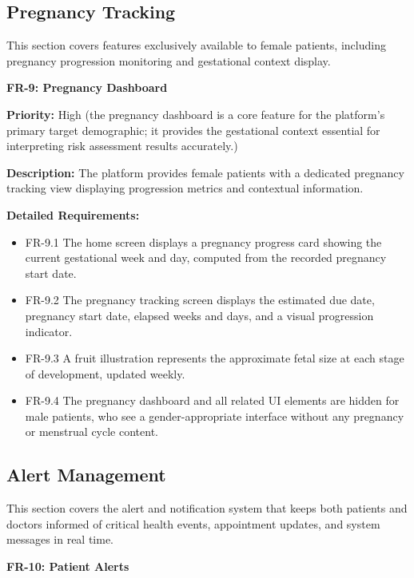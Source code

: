 \subsection{Pregnancy Tracking}

This section covers features exclusively available to female patients, including
pregnancy progression monitoring and gestational context display.

\textbf{FR-9: Pregnancy Dashboard}

\textbf{Priority:} High (the pregnancy dashboard is a core feature for the platform's primary target demographic; it provides the gestational context essential for interpreting risk assessment results accurately.)

\textbf{Description:} The platform provides female patients with a dedicated pregnancy
tracking view displaying progression metrics and contextual information.

\textbf{Detailed Requirements:}
\begin{itemize}
    \item FR-9.1 \; The home screen displays a pregnancy progress card showing the
    current gestational week and day, computed from the recorded pregnancy start date.
    \item FR-9.2 \; The pregnancy tracking screen displays the estimated due date,
    pregnancy start date, elapsed weeks and days, and a visual progression indicator.
    \item FR-9.3 \; A fruit illustration represents the approximate fetal size at each
    stage of development, updated weekly.
    \item FR-9.4 \; The pregnancy dashboard and all related UI elements are hidden
    for male patients, who see a gender-appropriate interface without any pregnancy
    or menstrual cycle content.
\end{itemize}

\subsection{Alert Management}

This section covers the alert and notification system that keeps both patients and
doctors informed of critical health events, appointment updates, and system messages
in real time.

\textbf{FR-10: Patient Alerts}

